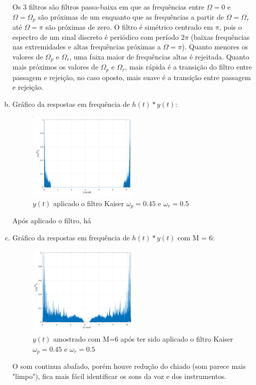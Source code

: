 \documentclass{article}
\begin{document}
\begin{enumerate}[(a)]
        Os 3 filtros são filtros passa-baixa em que as frequências entre $\Omega = 0$ e $\Omega = \Omega_p$ são próximas de um enquanto que as frequências a partir de $\Omega = \Omega_r$ até $\Omega = \pi$ são próximas de zero. O filtro é simétrico centrado em $\pi$, pois o espectro de um sinal discreto é periódico com período $2\pi$ (baixas frequências nas extremidades e altas frequências próximas a $\Omega = \pi$). Quanto menores os valores de $\Omega_p$ e $\Omega_r$, uma faixa maior de frequências altas é rejeitada. Quanto mais próximos os valores de $\Omega_p$ e $\Omega_r$, mais rápida é a transição do filtro entre passagem e rejeição, no caso oposto, mais suave é a transição entre passagem e rejeição.

\break\vfill

\item
    Gráfico da respostas em frequência de $h(t)*y(t)$:

    \begin{figure}[H]
    \centering
    \includegraphics[width=0.5\textwidth]{images/conv_h.png}
        \caption{$y(t)$ aplicado o filtro Kaiser $\omega_p = 0.45$ e $\omega_r = 0.5$}
    \end{figure}

    Após aplicado o filtro, há 

\item
    Gráfico da respostas em frequência de $h(t)*y(t)$ com M = 6:

    \begin{figure}[H]
    \centering
    \includegraphics[width=0.5\textwidth]{images/resamp_after_filter.png}
        \caption{$y(t)$ amostrado com M=6 após ter sido aplicado o filtro Kaiser $\omega_p = 0.45$ e $\omega_r = 0.5$}
    \end{figure}

    O som continua abafado, porém houve redução do chiado (som parece mais "limpo"), fica mais fácil identificar os sons da voz e dos instrumentos.

\end{enumerate}
\end{document}
